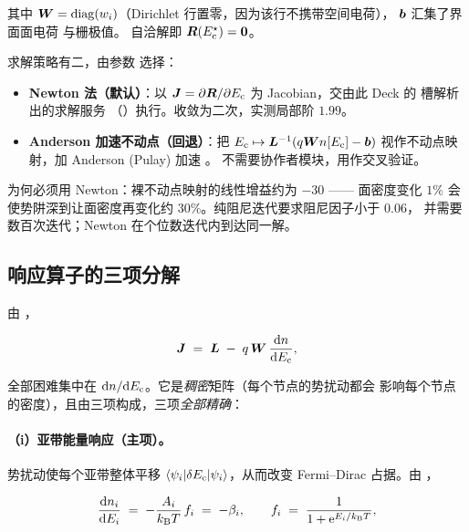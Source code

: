 其中 $\bm{W}=\operatorname{diag}(w_i)$（Dirichlet 行置零，因为该行不携带空间电荷），
$\bm{b}$ 汇集了界面面电荷  与栅极值。
自洽解即 $\bm{R}(E_{\mathrm{c}}^{\star})=\bm{0}$。

求解策略有二，由参数  选择：

\begin{itemize}[leftmargin=1.7em,itemsep=0.3em,topsep=0.35em]
  \item \textbf{Newton 法（默认）}：以 $\bm{J}=\partial\bm{R}/\partial E_{\mathrm{c}}$
        为 Jacobian，交由此 Deck 的  槽解析出的求解服务
        （）执行。收敛为二次，实测局部阶 $1.99$。
  \item \textbf{Anderson 加速不动点（回退）}：把 $E_{\mathrm{c}}\mapsto\bm{L}^{-1}(q\bm{W}n[E_{\mathrm{c}}]-\bm{b})$
        视作不动点映射，加 Anderson (Pulay) 加速 \cite{anderson1965}。
        不需要协作者模块，用作交叉验证。
\end{itemize}

为何必须用 Newton：裸不动点映射的线性增益约为 $-30$ —— 面密度变化 $1\%$
会使势阱深到让面密度再变化约 $30\%$。纯阻尼迭代要求阻尼因子小于 $0.06$，
并需要数百次迭代；Newton 在个位数迭代内到达同一解。

\subsection{响应算子的三项分解}
\label{sec:sp1d-jacobian}

由 ，

\begin{equation}
\bm{J} \;=\; \bm{L} \;-\; q\,\bm{W}\,\frac{\mathrm{d} n}{\mathrm{d} E_{\mathrm{c}}},
\label{eq:jacobian}
\end{equation}

全部困难集中在 $\mathrm{d} n/\mathrm{d}E_{\mathrm{c}}$。它是\emph{稠密}矩阵（每个节点的势扰动都会
影响每个节点的密度），且由三项构成，三项\emph{全部精确}：

\paragraph{（i）亚带能量响应（主项）。}
势扰动使每个亚带整体平移 $\left\langle \psi_i|\delta E_{\mathrm{c}}|\psi_i \right\rangle$，从而改变
Fermi--Dirac 占据。由 ，

\begin{equation}
\frac{\mathrm{d} n_i}{\mathrm{d} E_{i}} \;=\; -\frac{A_i}{k_{\mathrm{B}}T}\,f_i \;=\; -\beta_i,
\qquad
f_i \;=\; \frac{1}{1+\mathrm{e}^{E_{i}/k_{\mathrm{B}}T}},
\label{eq:beta}
\end{equation}

